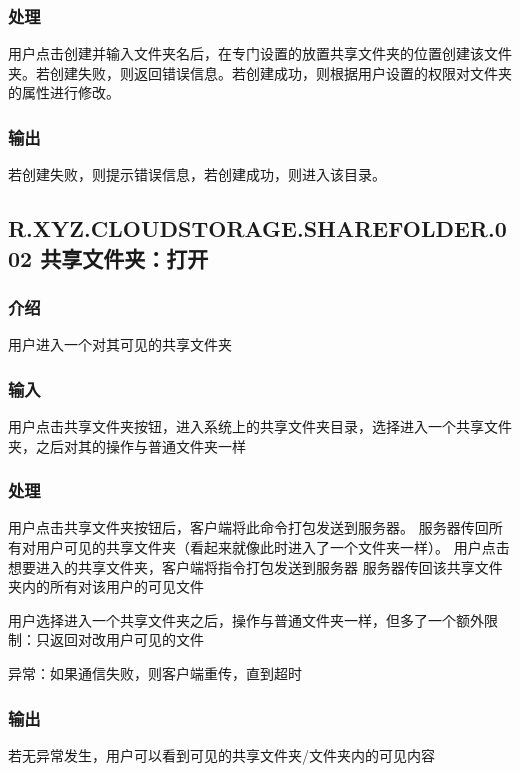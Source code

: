 \subsubsection{处理} 

用户点击创建并输入文件夹名后，在专门设置的放置共享文件夹的位置创建该文件夹。若创建失败，则返回错误信息。若创建成功，则根据用户设置的权限对文件夹的属性进行修改。

\subsubsection{输出} 

若创建失败，则提示错误信息，若创建成功，则进入该目录。

\subsection{R.XYZ.CLOUDSTORAGE.SHAREFOLDER.002 共享文件夹：打开}

\subsubsection{介绍}

用户进入一个对其可见的共享文件夹

\subsubsection{输入} 

用户点击共享文件夹按钮，进入系统上的共享文件夹目录，选择进入一个共享文件夹，之后对其的操作与普通文件夹一样

\subsubsection{处理} 

用户点击共享文件夹按钮后，客户端将此命令打包发送到服务器。
服务器传回所有对用户可见的共享文件夹（看起来就像此时进入了一个文件夹一样）。
用户点击想要进入的共享文件夹，客户端将指令打包发送到服务器
服务器传回该共享文件夹内的所有对该用户的可见文件

用户选择进入一个共享文件夹之后，操作与普通文件夹一样，但多了一个额外限制：只返回对改用户可见的文件

异常：如果通信失败，则客户端重传，直到超时
 
\subsubsection{输出} 
若无异常发生，用户可以看到可见的共享文件夹/文件夹内的可见内容

